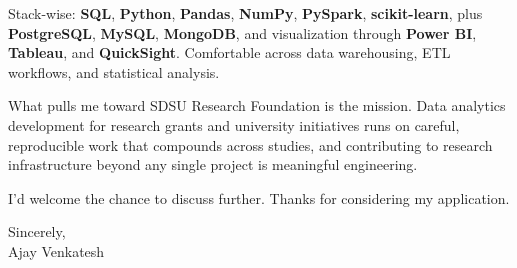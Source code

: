 \documentclass[letterpaper,11pt]{article}
\begin{document}
Stack-wise: \textbf{SQL}, \textbf{Python}, \textbf{Pandas}, \textbf{NumPy}, \textbf{PySpark}, \textbf{scikit-learn}, plus \textbf{PostgreSQL}, \textbf{MySQL}, \textbf{MongoDB}, and visualization through \textbf{Power BI}, \textbf{Tableau}, and \textbf{QuickSight}. Comfortable across data warehousing, ETL workflows, and statistical analysis.

What pulls me toward SDSU Research Foundation is the mission. Data analytics development for research grants and university initiatives runs on careful, reproducible work that compounds across studies, and contributing to research infrastructure beyond any single project is meaningful engineering.

I'd welcome the chance to discuss further. Thanks for considering my application.

\vspace{12pt}
Sincerely, \\
Ajay Venkatesh
\end{document}
